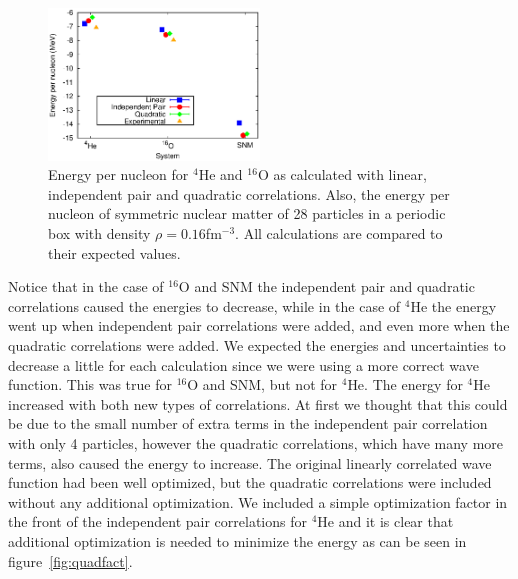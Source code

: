 \begin{figure}[h!]
   \centering
   \includegraphics[width=0.5\textwidth]{energy.eps}
   \caption{Energy per nucleon for ${}^4$He and ${}^{16}$O as calculated with linear, independent pair and quadratic correlations. Also, the energy per nucleon of symmetric nuclear matter of 28 particles in a periodic box with density $\rho=0.16$fm$^{-3}$. All calculations are compared to their expected values.}
   \label{fig:energies}
\end{figure}
Notice that in the case of ${}^{16}$O and SNM the independent pair and quadratic correlations caused the energies to decrease, while in the case of ${}^4$He the energy went up when independent pair correlations were added, and even more when the quadratic correlations were added. We expected the energies and uncertainties to decrease a little for each calculation since we were using a more correct wave function. This was true for $^{16}$O and SNM, but not for $^{4}$He. The energy for $^{4}$He increased with both new types of correlations. At first we thought that this could be due to the small number of extra terms in the independent pair correlation with only 4 particles, however the quadratic correlations, which have many more terms, also caused the energy to increase. %
The original linearly correlated wave function had been well optimized, but the  quadratic correlations were included without any additional optimization. We included a simple optimization factor in the front of the independent pair correlations for $^4$He and it is clear that additional optimization is needed to minimize the energy as can be seen in figure~\ref{fig:quadfact}.
